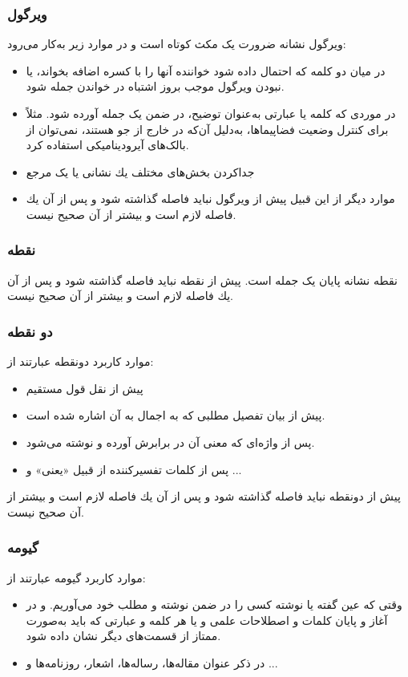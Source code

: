 \subsubsection{ویرگول}
ویرگول نشانه ضرورت یک مكث كوتاه است و در موارد زیر به‌كار می‌رود:
\begin{itemize}
	\item 
	در میان دو كلمه كه احتمال داده شود خواننده آنها را با كسره اضافه بخواند، یا نبودن ویرگول موجب بروز اشتباه در خواندن جمله شود.
	\item
	در موردی كه كلمه یا عبارتی به‌‌‌‌عنوان توضیح، در ضمن یک جمله آورده شود. مثلاً برای کنترل وضعیت فضاپیماها، به‌دلیل آن‌که در خارج از جو هستند، نمی‌توان از بالک‌های آیرودینامیکی استفاده کرد.
	\item
	جدا‌كردن بخش‌های مختلف یك نشانی یا یک مرجع
	\item
موارد دیگر از این قبیل
	پیش از ویرگول نباید فاصله گذاشته شود و پس از آن یك فاصله لازم است و بیشتر از آن صحیح نیست.
\end{itemize}
\subsubsection{نقطه}
نقطه نشانه پایان یک جمله است. پیش از نقطه نباید فاصله گذاشته شود و پس از آن یك فاصله لازم است و بیشتر از آن صحیح نیست. 
\subsubsection{دو نقطه}
موارد كاربرد دونقطه عبارتند از:
\begin{itemize}
	\item 
	پیش از نقل قول مستقیم
	\item 
	پیش از بیان تفصیل مطلبی كه به اجمال به آن اشاره شده ‌است.
	\item 
	پس از واژه‌ای كه معنی آن در برابرش آورده و نوشته می‌شود.
	\item 
	پس از كلمات تفسیر‌كننده از قبیل «یعنی» و ...
\end{itemize}	
پیش از دونقطه نباید فاصله گذاشته شود و پس از آن یك فاصله لازم است و بیشتر از آن صحیح نیست.
\subsubsection{گیومه}
موارد كاربرد گیومه عبارتند از:
\begin{itemize}
	\item 
وقتی كه عین گفته یا نوشته كسی را در ضمن نوشته و مطلب خود می‌آوریم. 
	و در آغاز و پایان كلمات و اصطلاحات علمی و یا هر كلمه و عبارتی كه باید به‌صورت ممتاز از قسمت‌های دیگر نشان داده شود.
	\item
	در ذكر عنوان مقاله‌ها، رساله‌ها، اشعار، روزنامه‌ها و ...
\end{itemize}
